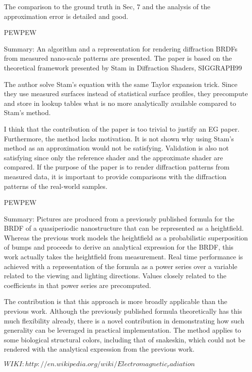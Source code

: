 The comparison to the ground truth in Sec, 7 and the analysis of the approximation error is detailed and good.

PEWPEW

Summary: An algorithm and a representation for rendering diffraction BRDFs from measured nano-scale patterns are presented.
The paper is based on the theoretical framework presented by Stam in Diffraction Shaders, SIGGRAPH99

The author solve Stam's equation with the same Taylor expansion trick. Since they use measured surfaces instead of statistical surface profiles, they precompute and store in lookup tables what is no more analytically available compared to Stam's method.

I think that the contribution of the paper is too trivial to justify an EG paper.
Furthermore, the method lacks motivation. It is not shown why using Stam's method as an approximation would not be satisfying.
Validation is also not satisfying since only the reference shader and the approximate shader are compared. If the purpose of the paper is to render diffraction patterns from measured data, it is important to provide comparisons with the diffraction patterns of the real-world samples.

PEWPEW

Summary: Pictures are produced from a previously published formula for the BRDF of a quasiperiodic nanostructure that can be represented as a heightfield. Whereas the previous work models the heightfield as a probabilistic superposition of bumps and proceeds to derive an analytical expression for the BRDF, this work actually takes the heightfield from measurement. Real time performance is achieved with a representation of the formula as a power series over a variable related to the viewing and lighting directions. Values closely related to the coefficients in that power series are precomputed.

The contribution is that this approach is more broadly applicable than the previous work. Although the previously published formula theoretically has this much flexibility already, there is a novel contribution in demonstrating how such generality can be leveraged in practical implementation. The method applies to some biological structural colors, including that of snakeskin, which could not be rendered with the analytical expression from the previous work.






$WIKI: http://en.wikipedia.org/wiki/Electromagnetic_radiation$

